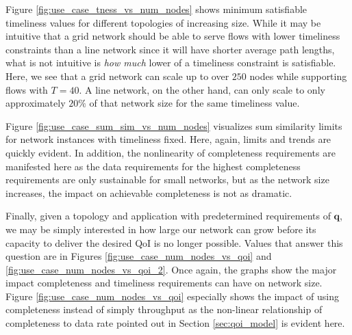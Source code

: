 Figure \ref{fig:use_case_tness_vs_num_nodes} shows minimum satisfiable timeliness values for different topologies of increasing size.  While it may be intuitive that a grid network should be able to serve flows with lower timeliness constraints than a line network since it will have shorter average path lengths, what is not intuitive is \emph{how much} lower of a timeliness constraint is satisfiable.  Here, we see that a grid network can scale up to over $250$ nodes while supporting flows with $T = 40$.  A line network, on the other hand, can only scale to only approximately $20\%$ of that network size for the same timeliness value.  %

Figure \ref{fig:use_case_sum_sim_vs_num_nodes} visualizes sum similarity limits for network instances with timeliness fixed.  Here, again, limits and trends are quickly evident.  In addition, the nonlinearity of completeness requirements are manifested here as the data requirements for the highest completeness requirements are only sustainable for small networks, but as the network size increases, the impact on achievable completeness is not as dramatic.  


Finally, given a topology and application with predetermined requirements of $\mathbf{q}$, we may be simply interested in how large our network can grow before its capacity to deliver the desired QoI is no longer possible.  Values that answer this question are in Figures \ref{fig:use_case_num_nodes_vs_qoi} and \ref{fig:use_case_num_nodes_vs_qoi_2}.  Once again, the graphs show the major impact completeness and timeliness requirements can have on network size.  Figure \ref{fig:use_case_num_nodes_vs_qoi} especially shows the impact of using completeness instead of simply throughput as the non-linear relationship of completeness to data rate pointed out in Section \ref{sec:qoi_model} is evident here.

